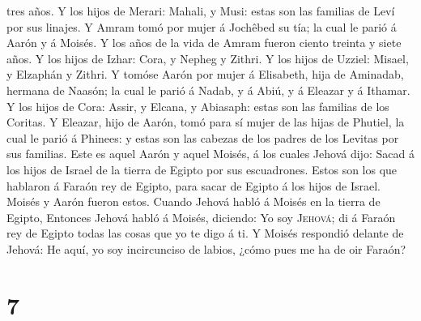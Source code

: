 tres años.  Y los hijos de Merari: Mahali, y Musi: estas
son las familias de Leví por sus linajes.  Y Amram tomó
por mujer á Jochêbed su tía; la cual le parió á Aarón y á Moisés. Y los
años de la vida de Amram fueron ciento treinta y siete años.
 Y los hijos de Izhar: Cora, y Nepheg y Zithri.
 Y los hijos de Uzziel: Misael, y Elzaphán y Zithri.
 Y tomóse Aarón por mujer á Elisabeth, hija de Aminadab,
hermana de Naasón; la cual le parió á Nadab, y á Abiú, y á Eleazar y á
Ithamar.  Y los hijos de Cora: Assir, y Elcana, y
Abiasaph: estas son las familias de los Coritas.  Y
Eleazar, hijo de Aarón, tomó para sí mujer de las hijas de Phutiel, la
cual le parió á Phinees: y estas son las cabezas de los padres de los
Levitas por sus familias.  Este es aquel Aarón y aquel
Moisés, á los cuales Jehová dijo: Sacad á los hijos de Israel de la
tierra de Egipto por sus escuadrones.  Estos son los que
hablaron á Faraón rey de Egipto, para sacar de Egipto á los hijos de
Israel. Moisés y Aarón fueron estos.  Cuando Jehová habló
á Moisés en la tierra de Egipto,  Entonces Jehová habló á
Moisés, diciendo: Yo soy \textsc{Jehová}; di á Faraón rey de Egipto
todas las cosas que yo te digo á ti.  Y Moisés respondió
delante de Jehová: He aquí, yo soy incircunciso de labios, ¿cómo pues me
ha de oir Faraón?

\hypertarget{section-6}{%
\section{7}\label{section-6}}

